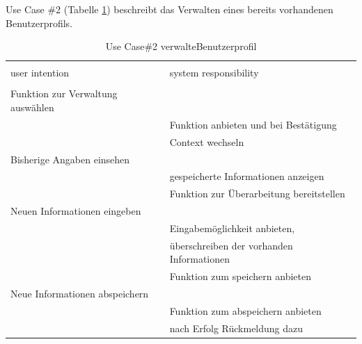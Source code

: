\newpage

Use Case \#2 (Tabelle \ref{tab:profilbearbeitenUC}) beschreibt das Verwalten eines bereits vorhandenen Benutzerprofils.
\begin{table}[H]
\caption{Use Case\#2 verwalteBenutzerprofil }
\centering
\begin{tabular}{l l}
\\ [-0.5ex]

\hline\hline
\\ [-0.5ex]
user intention & system responsibility
\\ [1.5ex]
\hline
\\ [-0.5ex]
Funktion zur Verwaltung auswählen   &                                      \\[1ex]
                                    & Funktion anbieten und bei Bestätigung      \\[1ex]
                                    & Context wechseln      \\[1ex]

Bisherige Angaben einsehen          &                                      \\[1ex]
                                    & gespeicherte Informationen anzeigen   \\[1ex]
                                    & Funktion zur Überarbeitung bereitstellen  \\[1ex] 
Neuen Informationen eingeben        &                                      \\[1ex] 
                                    & Eingabemöglichkeit anbieten,  \\[1ex]
                                    & überschreiben der vorhanden Informationen   \\[1ex]
                                    & Funktion zum speichern anbieten \\[1ex]
Neue Informationen abspeichern      &                                      \\[1ex]
                                    & Funktion zum abspeichern anbieten             \\[1ex]
                                    & nach Erfolg Rückmeldung dazu    \\[1ex]
\hline
\end{tabular}
\label{tab:profilbearbeitenUC}
\end{table}

